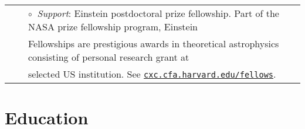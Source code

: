 \documentclass[a4paper]{moderncv}
\begin{document}
\vspace{-0.1cm}
\begin{tabular}{rcl}
&\hspace{0.4cm} &$\circ\;\;${\textit{Support}}: Einstein postdoctoral prize fellowship.  Part of the NASA prize fellowship program, Einstein\\
&\hspace{0.4cm} &  \hspace{0.4cm}Fellowships are prestigious awards in theoretical astrophysics consisting of personal research grant at\\
&\hspace{0.4cm} &  \hspace{0.4cm}selected US institution. See  \href{http://cxc.cfa.harvard.edu/fellows}{\texttt{cxc.cfa.harvard.edu/fellows}}.\\
\end{tabular}






\section{Education}
\end{document}
